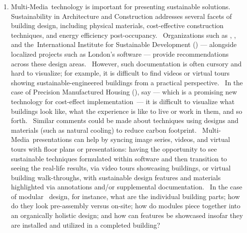 \documentclass[10.5pt]{article}
\begin{document}
{{\begin{enumerate}[leftmargin=3pt]
\item{} Multi-Media technology is important for presenting sustainable \AEC{} solutions.  Sustainability in Architecture and Construction addresses several facets of building design, including physical materials, cost-effective construction techniques, and energy efficiency post-occupancy.  Organizations such as \ISI{}, \WRI{}, and the International Institute for Sustainable Development (\IISD{}) --- alongside localized projects such as London's \PRiSM{} software --- provide \AEC{} recommendations across these design areas.  However, such documentation is often cursory and hard to visualize; for example, it is difficult to find videos or virtual tours showing sustainable-engineered buildings from a practical perspective.  In the case of Precision Manufactured Housing 
(\PMH{}), say --- which is a promising new technology for cost-effect \AEC{} implementation --- it is difficult to visualize what \PMH{} buildings look like, what the experience is like to live or work in them, and so forth.  Similar comments could be made about  techniques using designs and materials (such as natural cooling) to reduce carbon footprint.  Multi-Media presentations can help by syncing image series, videos, and virtual tours with \TwoD{} floor plans or \ThreeD{} \CAD{} presentations: 
having the opportunity to see sustainable \AEC{} techniques formulated within \CAD{} software and then transition to seeing the real-life results, via video tours showcasing buildings, or virtual building walk-throughs, with sustainable design features and materials highlighted via annotations and/or supplemental documentation.  In the case of modular \PMH{} design, for instance, what are the individual building parts; how do they look pre-assembly versus on-site; how do modules piece together into an organically holistic design; and how can  features be showcased insofar they are installed and utilized in a completed building?     


\end{enumerate}}}
\end{document}
